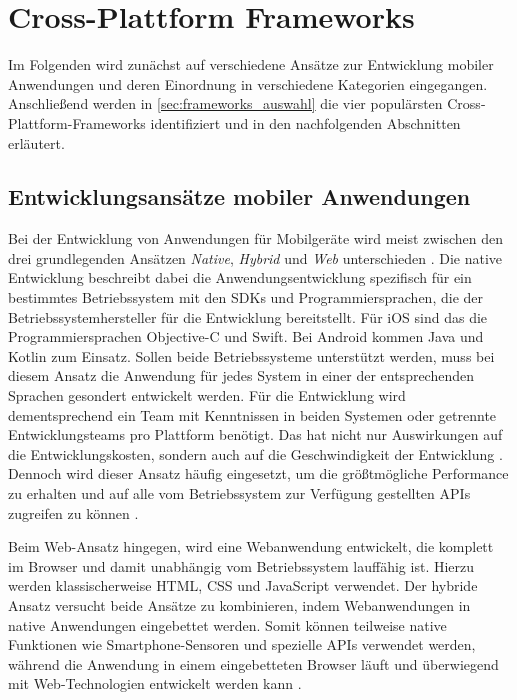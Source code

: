 \chapter{Cross-Plattform Frameworks}
\label{ch:frameworks}

Im Folgenden wird zunächst auf verschiedene Ansätze zur Entwicklung mobiler Anwendungen und deren Einordnung in verschiedene Kategorien eingegangen.
Anschließend werden in \autoref{sec:frameworks_auswahl} die vier populärsten Cross-Plattform-Frameworks identifiziert und in den nachfolgenden Abschnitten erläutert.

\section{Entwicklungsansätze mobiler Anwendungen}
\label{sec:entwicklungsansaetze}
Bei der Entwicklung von Anwendungen für Mobilgeräte wird meist zwischen den drei grundlegenden Ansätzen \textit{Native}, \textit{Hybrid} und \textit{Web} unterschieden \cite{Nunkesser_Taxonomy_Apps, Que_Comparison_Hybrid_Native}.
Die native Entwicklung beschreibt dabei die Anwendungsentwicklung spezifisch für ein bestimmtes Betriebssystem mit den \acp{SDK} und Programmiersprachen, die der Betriebssystemhersteller für die Entwicklung bereitstellt.
Für iOS sind das die Programmiersprachen Objective-C und Swift.
Bei Android kommen Java und Kotlin zum Einsatz.
Sollen beide Betriebssysteme unterstützt werden, muss bei diesem Ansatz die Anwendung für jedes System in einer der entsprechenden Sprachen gesondert entwickelt werden.
Für die Entwicklung wird dementsprechend ein Team mit Kenntnissen in beiden Systemen oder getrennte Entwicklungsteams pro Plattform benötigt.
Das hat nicht nur Auswirkungen auf die Entwicklungskosten, sondern auch auf die Geschwindigkeit der Entwicklung \cite{Manchanda_CrossPlatformFrameworks}.
Dennoch wird dieser Ansatz häufig eingesetzt, um die größtmögliche Performance zu erhalten und auf alle vom Betriebssystem zur Verfügung gestellten \acp{API} zugreifen zu können \cite{Pinto_Native_to_Cross_Platform}.

Beim Web-Ansatz hingegen, wird eine Webanwendung entwickelt, die komplett im Browser und damit unabhängig vom Betriebssystem lauffähig ist.
Hierzu werden klassischerweise \ac{HTML}, \ac{CSS} und JavaScript verwendet.
Der hybride Ansatz versucht beide Ansätze zu kombinieren, indem Webanwendungen in native Anwendungen eingebettet werden.
Somit können teilweise native Funktionen wie Smartphone-Sensoren und spezielle \acp{API} verwendet werden, während die Anwendung in einem eingebetteten Browser läuft und überwiegend mit Web-Technologien entwickelt werden kann \cite{Nunkesser_Taxonomy_Apps}.

